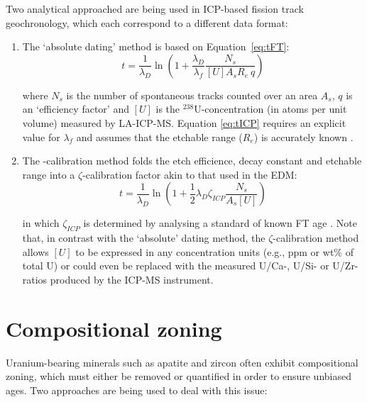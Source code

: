 \begin{refsection}
Two analytical approached are being used in ICP-based fission track
geochronology, which each correspond to a different data format:

\begin{enumerate}
\item The `absolute dating' method is based on
  Equation~\ref{eq:tFT}:
  \begin{equation}
    {t} = \frac{1}{\lambda_D}
    \ln \left(1 + \frac{\lambda_D}{\lambda_f}\frac{N_s}{[{U}] A_s R_e ~ q}\right)
    \label{eq:tICP}
  \end{equation}

  where $N_s$ is the number of spontaneous tracks counted over an area
  $A_s$, $q$ is an `efficiency factor' \citep[$\sim$0.93 for apatite and
    $\sim$1 for
    zircon,][]{iwano1998,enkelmann2003,jonckheere2003b,soares2013} and
  $[{U}]$ is the $^{238}$U-concentration (in atoms per unit volume)
  measured by LA-ICP-MS. Equation \ref{eq:tICP} requires an explicit
  value for $\lambda_f$ and assumes that the etchable range ($R_e$) is
  accurately known \citep{soares2014}.

\item The \textzeta-calibration method folds the etch efficience,
  decay constant and etchable range into a $\zeta$-calibration factor
  akin to that used in the EDM:
  \begin{equation}
    {t} = \frac{1}{\lambda_D}
    \ln \left(1+\frac{1}{2}\lambda_D{\zeta}_{ICP}\frac{N_s}{A_s[{U}]}\right)
    \label{eq:tzetahatICP}
  \end{equation}

  in which ${\zeta}_{ICP}$ is determined by analysing a standard of
  known FT age \citep{hasebe2004}. Note that, in contrast with the
  `absolute' dating method, the $\zeta$-calibration method allows
  $[{U}]$ to be expressed in any concentration units (e.g., ppm or
  wt\% of total U) or could even be replaced with the measured U/Ca-,
  U/Si- or U/Zr-ratios produced by the ICP-MS instrument.
\end{enumerate}

\section{Compositional zoning}\label{sec:zoning}

Uranium-bearing minerals such as apatite and zircon often exhibit
compositional zoning, which must either be removed or quantified in
order to ensure unbiased ages. Two approaches are being used to deal
with this issue:


\end{refsection}
